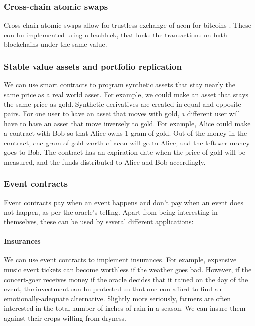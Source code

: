 \documentclass[a4paper, 10pt, conference]{ieeeconf}      %
\begin{document}
\begin{draft}
\subsubsection{Cross-chain atomic swaps}
Cross chain atomic swaps allow for trustless exchange of aeon for bitcoins \cite{atomic,interledger}.
These can be implemented using a hashlock, that locks the transactions on both blockchains under the same value.


\subsubsection{Stable value assets and portfolio replication}
We can use smart contracts to program synthetic assets that stay nearly the same price as a real world asset. For example, we could make an asset that stays the same price as gold. Synthetic derivatives are created in equal and opposite pairs. For one user to have an asset that moves with gold, a different user will have to have an asset that move inversely to gold.
For example, Alice could make a contract with Bob so that Alice owns 1 gram of gold. 
Out of the money in the contract, one gram of gold worth of aeon will go to Alice, and the leftover money goes to Bob.
The contract has an expiration date when the price of gold will be measured, and the funds distributed to Alice and Bob accordingly.



\subsubsection{Event contracts}
Event contracts pay when an event happens and don't pay when an event does not happen, as per the oracle's telling. Apart from being interesting in themselves, these can be used by several different applications:

\paragraph{Insurances}
We can use event contracts to implement insurances. For example, expensive music event tickets can become worthless if the weather goes bad. However, if the concert-goer receives money if the oracle decides that it rained on the day of the event, the investment can be protected so that one can afford to find an emotionally-adequate alternative. Slightly more seriously, farmers are often interested in the total number of inches of rain in a season. We can insure them against their crops wilting from dryness.



\end{draft}
\end{document}
